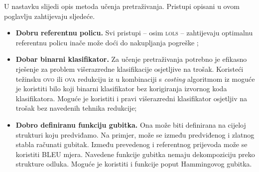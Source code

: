 U nastavku slijedi opis metoda učenja pretraživanja. Pristupi opisani u ovom
poglavlju zahtijevaju sljedeće.

\begin{itemize}

  \item \textbf{Dobru referentnu policu.} Svi pristupi -- osim \textsc{lols} --
  zahtijevaju optimalnu referentnu policu inače može doći do nakupljanja
  pogreške ;

  \item \textbf{Dobar binarni klasifikator.} Za učenje pretraživanja potrebno je
  efikasno rješenje za problem višerazredne klasifikacije osjetljive na trošak.
  Koristeći težinsku \textsc{ovo} ili \textsc{ova}  redukciju iz \citep{beygelzimer2005weighted,
  beygelzimer2005error} u kombinaciji s \textit{costing} algoritmom iz
  \citep{zadrozny2003cost} moguće je koristiti bilo koji binarni klasifikator
  bez korigiranja izvornog koda klasifikatora. Moguće je koristiti i pravi
  višerazredni klasifikator osjetljiv na trošak bez navedenih tehnika redukcije;

  \item \textbf{Dobro definiranu funkciju gubitka.} Ona može biti definirana na
  cijeloj strukturi koju predviđamo. Na primjer, može se između predviđenog i
  zlatnog stabla računati  gubitak. Između prevedenog i
  referentnog prijevoda može se koristiti BLEU  mjera. Navedene funkcije gubitka nemaju dekompoziciju preko
  strukture odluka. Moguće je koristiti i funkcije poput Hammingovog gubitka.

\end{itemize}
